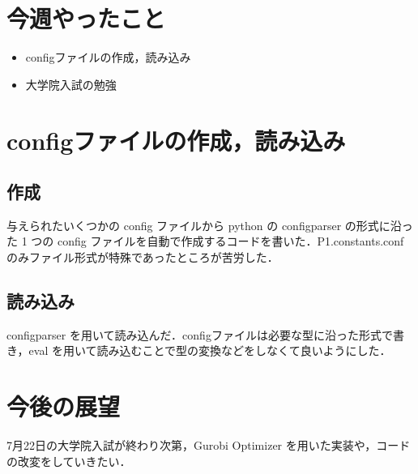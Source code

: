 \documentclass[twocolumn]{jarticle}
\begin{document}


\section{今週やったこと}
	\begin{itemize}
        \item configファイルの作成，読み込み
        \item 大学院入試の勉強
	\end{itemize}

\section{configファイルの作成，読み込み}
    \subsection{作成}
    与えられたいくつかの config ファイルから python の configparser の形式に沿った 1 つの config ファイルを自動で作成するコードを書いた．P1.constants.conf のみファイル形式が特殊であったところが苦労した．

    \subsection{読み込み}
    configparser を用いて読み込んだ．configファイルは必要な型に沿った形式で書き，eval を用いて読み込むことで型の変換などをしなくて良いようにした．

\section{今後の展望}
    7月22日の大学院入試が終わり次第，Gurobi Optimizer を用いた実装や，コードの改変をしていきたい．


\end{document}
